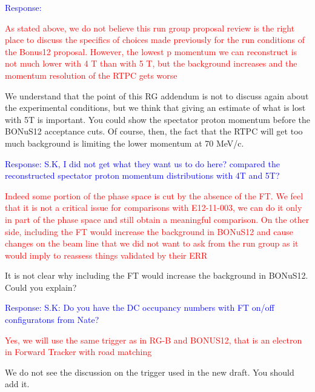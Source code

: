 \begin{itemize}
  \textcolor{blue}{Response: }
  
       
 \textcolor{red}{
 \item As stated above, we do not believe this run group proposal review is the 
    right place to discuss the specifics of choices made previously for the run 
       conditions of the Bonus12 proposal. However, the lowest p momentum we 
       can reconstruct is not much lower with 4 T than with 5 T, but the 
       background increases and the momentum resolution of the RTPC gets worse}
\newline

We understand that the point of this RG addendum is not to discuss again about 
       the experimental conditions, but we think that giving an estimate of 
       what is lost with 5T is important. You could show the spectator proton 
       momentum before the BONuS12 acceptance cuts. Of course, then, the fact 
       that the RTPC will get too much background is limiting the lower 
       momentum at 70 MeV/c.

  
       \textcolor{blue}{Response: S.K, I did not get what they want us to do 
       here? compared the reconstructed spectator proton momentum distributions 
       with 4T and 5T?}

\textcolor{red}{
\item Indeed some portion of the phase space is cut by the absence of the FT. 
   We feel that it is not a critical issue
for comparisons with E12-11-003, we can do it only in part of the phase space and still
obtain a meaningful comparison. On the other side, including the FT would increase
the background in BONuS12 and cause changes on the beam line that we did not want
to ask from the run group as it would imply to reassess things validated by their ERR
}
 \newline

It is not clear why including the FT would increase the background in BONuS12.  
Could you explain?
  
  \textcolor{blue}{Response: S.K: Do you have the DC occupancy numbers with FT 
  on/off configuratons from Nate?}
 



\textcolor{red}{
 \item Yes, we will use the same trigger as in RG-B and BONUS12, that is an 
    electron in Forward Tracker with road matching  }
 \newline
We do not see the discussion on the trigger used in the new draft. You should 
add it.



\end{itemize}
